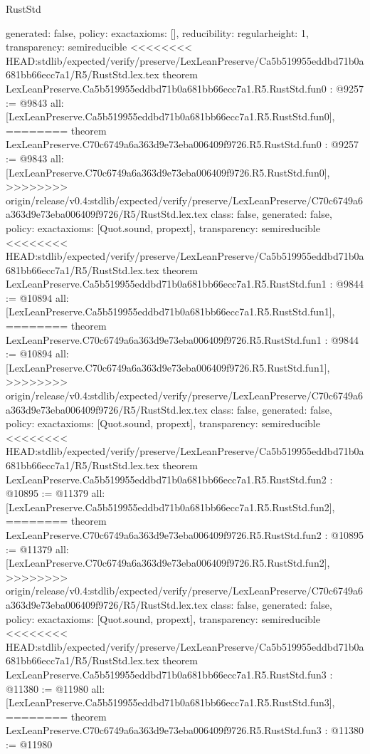 \begin{lexlean}{RustStd}
\begin{coremodule}
{\begin{coremodule}
{{{  generated: false,
  policy: exact{axioms: []},
  reducibility: regular{height: 1},
  transparency: semireducible
}
<<<<<<<< HEAD:stdlib/expected/verify/preserve/LexLeanPreserve/Ca5b519955eddbd71b0a681bb66ecc7a1/R5/RustStd.lex.tex
theorem LexLeanPreserve.Ca5b519955eddbd71b0a681bb66ecc7a1.R5.RustStd.fun0 : @9257 := @9843 {
  all: [LexLeanPreserve.Ca5b519955eddbd71b0a681bb66ecc7a1.R5.RustStd.fun0],
========
theorem LexLeanPreserve.C70c6749a6a363d9e73eba006409f9726.R5.RustStd.fun0 : @9257 := @9843 {
  all: [LexLeanPreserve.C70c6749a6a363d9e73eba006409f9726.R5.RustStd.fun0],
>>>>>>>> origin/release/v0.4:stdlib/expected/verify/preserve/LexLeanPreserve/C70c6749a6a363d9e73eba006409f9726/R5/RustStd.lex.tex
  class: false,
  generated: false,
  policy: exact{axioms: [Quot.sound, propext]},
  transparency: semireducible
}
<<<<<<<< HEAD:stdlib/expected/verify/preserve/LexLeanPreserve/Ca5b519955eddbd71b0a681bb66ecc7a1/R5/RustStd.lex.tex
theorem LexLeanPreserve.Ca5b519955eddbd71b0a681bb66ecc7a1.R5.RustStd.fun1 : @9844 := @10894 {
  all: [LexLeanPreserve.Ca5b519955eddbd71b0a681bb66ecc7a1.R5.RustStd.fun1],
========
theorem LexLeanPreserve.C70c6749a6a363d9e73eba006409f9726.R5.RustStd.fun1 : @9844 := @10894 {
  all: [LexLeanPreserve.C70c6749a6a363d9e73eba006409f9726.R5.RustStd.fun1],
>>>>>>>> origin/release/v0.4:stdlib/expected/verify/preserve/LexLeanPreserve/C70c6749a6a363d9e73eba006409f9726/R5/RustStd.lex.tex
  class: false,
  generated: false,
  policy: exact{axioms: [Quot.sound, propext]},
  transparency: semireducible
}
<<<<<<<< HEAD:stdlib/expected/verify/preserve/LexLeanPreserve/Ca5b519955eddbd71b0a681bb66ecc7a1/R5/RustStd.lex.tex
theorem LexLeanPreserve.Ca5b519955eddbd71b0a681bb66ecc7a1.R5.RustStd.fun2 : @10895 := @11379 {
  all: [LexLeanPreserve.Ca5b519955eddbd71b0a681bb66ecc7a1.R5.RustStd.fun2],
========
theorem LexLeanPreserve.C70c6749a6a363d9e73eba006409f9726.R5.RustStd.fun2 : @10895 := @11379 {
  all: [LexLeanPreserve.C70c6749a6a363d9e73eba006409f9726.R5.RustStd.fun2],
>>>>>>>> origin/release/v0.4:stdlib/expected/verify/preserve/LexLeanPreserve/C70c6749a6a363d9e73eba006409f9726/R5/RustStd.lex.tex
  class: false,
  generated: false,
  policy: exact{axioms: [Quot.sound, propext]},
  transparency: semireducible
}
<<<<<<<< HEAD:stdlib/expected/verify/preserve/LexLeanPreserve/Ca5b519955eddbd71b0a681bb66ecc7a1/R5/RustStd.lex.tex
theorem LexLeanPreserve.Ca5b519955eddbd71b0a681bb66ecc7a1.R5.RustStd.fun3 : @11380 := @11980 {
  all: [LexLeanPreserve.Ca5b519955eddbd71b0a681bb66ecc7a1.R5.RustStd.fun3],
========
theorem LexLeanPreserve.C70c6749a6a363d9e73eba006409f9726.R5.RustStd.fun3 : @11380 := @11980 {
}}}}}}}
\end{coremodule}}
\end{coremodule}
\end{lexlean}
